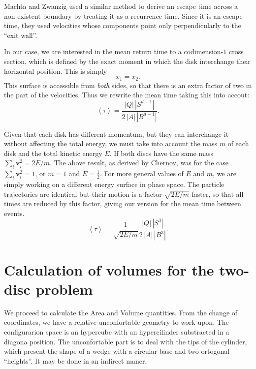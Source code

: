 \documentclass[a4paper,10pt]{article}
\newcommand{\mean}[1]{\left \langle #1 \right \rangle}
\newcommand{\vv}{\mathbf{v}}
\begin{document}
Machta and Zwanzig \cite{MachtaZwan} used a similar method to derive an escape 
time across a non-existent boundary by treating it as a recurrence time.
Since it is an escape time, they used velocities whose components point only 
perpendicularly to the ``exit wall''.

In our case, we are interested in the mean return time to a codimension-$1$ cross section, 
which is defined by the exact moment
in which the disk interchange their horizontal position. This is simply
\begin{equation} \label{condchoque}
x_1 = x_2.
\end{equation}
This surface is accessible from \emph{both} sides, 
so that there is an extra factor of two in the part of the velocities. Thus 
we rewrite the mean time taking this into accout: 
\begin{equation}
 \mean{\tau} = \frac{|Q| \, |S^{d-1}|} {2 \, |A| \, |B^{d-1}|}.	
\end{equation}


Given that each disk has different momentum, but
they can interchange it without affecting the
total energy, we must take into account the mass $m$ of each disk and the total kinetic energy $E$.
If both discs have the same mass $\sum_i \vv_i^2 = 2E / m$.
The above result, as derived by Chernov, was for the case $\sum_i \vv_i^2 = 1$, or $m=1$ and $E=\frac{1}{2}$.  
For more general values of $E$ and $m$, we are simply working on a different energy surface in phase space. 
The particle trajectories are identical but their motion is a factor
$\sqrt{2E/m}$ faster, so that all times are reduced by this factor, giving our version for
the mean time between events.
\begin{equation}
  \mean{\tau} = \frac{1}{\sqrt{2E / m}} 
\frac{|Q| \, |S^3|} {2 \, |A| \, |B^3|}.	
\end{equation}



\section{Calculation of volumes for the two-disc problem}

We proceed to calculate the Area and Volume quantities. From the change of coordinates,
we have a relative unconfortable geometry to work upon. The configurarion
space is an hypercube with an hypercilinder substracted in a diagona position.
The unconfortable part is to deal with the tips of the cylinder, which
present the  shape of a wedge with a circular base and two 
ortogonal ``heights''. It may be done in an indirect maner.
\end{document}
